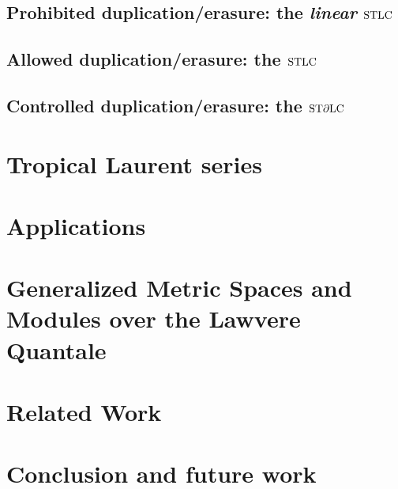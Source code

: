 \documentclass[conference]{IEEEtran}
\begin{document}
\subsection{Prohibited duplication/erasure: the \emph{linear} $\mathrm{STLC}$}


\subsection{Allowed duplication/erasure: the $\mathrm{STLC}$}
%

\subsection{Controlled duplication/erasure: the $\mathrm{ST}\partial\mathrm{LC}$}
%


\section{Tropical Laurent series}\label{section4}
%


\section{Applications}\label{sec:app}\label{section5}
%


\section{Generalized Metric Spaces and Modules over the Lawvere Quantale}\label{section6}
%


\section{Related Work}\label{section7}



\section{Conclusion and future work}\label{section8}




\end{document}
